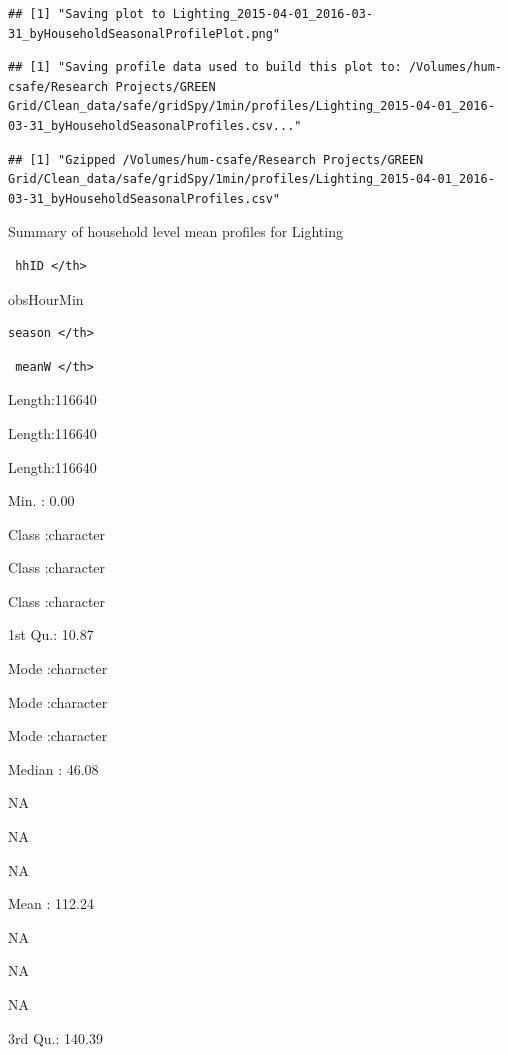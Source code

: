 \documentclass[]{article}
\begin{document}
\begin{verbatim}
## [1] "Saving plot to Lighting_2015-04-01_2016-03-31_byHouseholdSeasonalProfilePlot.png"
\end{verbatim}

\begin{verbatim}
## [1] "Saving profile data used to build this plot to: /Volumes/hum-csafe/Research Projects/GREEN Grid/Clean_data/safe/gridSpy/1min/profiles/Lighting_2015-04-01_2016-03-31_byHouseholdSeasonalProfiles.csv..."
\end{verbatim}

\begin{verbatim}
## [1] "Gzipped /Volumes/hum-csafe/Research Projects/GREEN Grid/Clean_data/safe/gridSpy/1min/profiles/Lighting_2015-04-01_2016-03-31_byHouseholdSeasonalProfiles.csv"
\end{verbatim}

Summary of household level mean profiles for Lighting

\begin{verbatim}
 hhID </th>
\end{verbatim}

obsHourMin

\begin{verbatim}
season </th>
\end{verbatim}

\begin{verbatim}
 meanW </th>
\end{verbatim}

Length:116640

Length:116640

Length:116640

Min. : 0.00

Class :character

Class :character

Class :character

1st Qu.: 10.87

Mode :character

Mode :character

Mode :character

Median : 46.08

NA

NA

NA

Mean : 112.24

NA

NA

NA

3rd Qu.: 140.39
\end{document}
